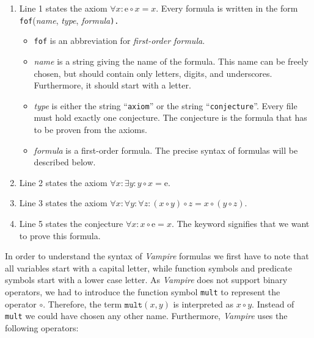 \begin{enumerate}
\item Line 1 states the axiom $\forall x: \mathrm{e} \circ x = x$.  Every formula is written in the form
      \\[0.2cm]
      \hspace*{1.3cm}
      \texttt{fof}(\textsl{name}, \textsl{type}, \textsl{formula}\texttt{).}
      \begin{itemize}
      \item \texttt{fof} is an abbreviation for \textsl{first-order formula}. 
      \item \textsl{name} is a string giving the name of the formula.  This name can be freely chosen,
            but should contain only letters, digits, and underscores.  Furthermore, it should start with a letter.
      \item \textsl{type} is either the string ``\texttt{axiom}'' or the string ``\texttt{conjecture}''.
            Every file must hold exactly one conjecture.  The conjecture is the formula that has to be proven from the
            axioms.
      \item \textsl{formula} is a first-order formula.  The precise syntax of formulas will be described below.
      \end{itemize}
\item Line 2 states the axiom $\forall x: \exists y: y \circ x = \mathrm{e}$.
\item Line 3 states the axiom $\forall x: \forall y: \forall z: (x \circ y) \circ z = x \circ (y \circ z)$.
\item Line 5 states the conjecture $\forall x: x \circ \mathrm{e} = x$.  The keyword 
      signifies that we want to prove this formula.  
\end{enumerate}
In order to understand the syntax of \textsl{Vampire} formulas we first have to note that all variables start
with a capital letter, while function symbols and predicate symbols start with a lower case letter.  As
\textsl{Vampire} does not support binary operators, we had to introduce the function symbol \texttt{mult} to
represent the operator $\circ$.  Therefore, the term $\mathtt{mult}(x, y)$ is interpreted as $x \circ y$.
Instead of \texttt{mult} we could have chosen any other name.  Furthermore, \textsl{Vampire} uses the following
operators:
